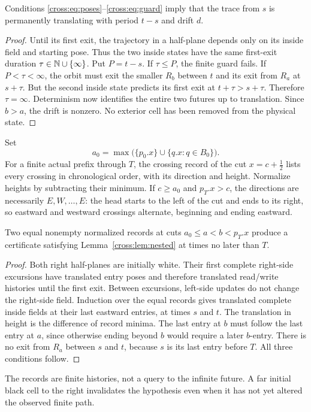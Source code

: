 \begin{lemma}\label{cross:lem:nested}
Conditions \eqref{cross:eq:poses}--\eqref{cross:eq:guard} imply that the trace from $s$ is
permanently translating with period $t-s$ and drift $d$.
\end{lemma}
\begin{proof}
Until its first exit, the trajectory in a half-plane depends only on its inside
field and starting pose. Thus the two inside states have the same first-exit
duration $\tau\in\mathbb N\cup\{\infty\}$. Put $P=t-s$. If $\tau\le P$, the finite
guard fails. If $P<\tau<\infty$, the orbit must exit the smaller $R_b$ between
$t$ and its exit from $R_a$ at $s+\tau$. But the second inside state predicts
its first exit at $t+\tau>s+\tau$. Therefore $\tau=\infty$. Determinism now
identifies the entire two futures up to translation. Since $b>a$, the drift
is nonzero. No exterior cell has been removed from the physical state.
\end{proof}

Set
\[
 a_0=\max\bigl(\{p_0.x\}\cup\{q.x:q\in B_0\}\bigr).
\]
For a finite actual prefix through $T$, the crossing record of the cut
$x=c+\tfrac12$ lists every crossing in chronological order, with its direction
and height. Normalize heights by subtracting their minimum. If $c\ge a_0$ and
$p_T.x>c$, the directions are necessarily $E,W,\ldots,E$: the head starts
to the left of the cut and ends to its right, so eastward and westward
crossings alternate, beginning and ending eastward.

\begin{lemma}\label{cross:lem:records}
Two equal nonempty normalized records at cuts $a_0\le a<b<p_T.x$ produce a
certificate satisfying Lemma~\ref{cross:lem:nested} at times no later than $T$.
\end{lemma}
\begin{proof}
Both right half-planes are initially white. Their first complete right-side
excursions have translated entry poses and therefore translated read/write
histories until the first exit. Between excursions, left-side updates do not
change the right-side field. Induction over the equal records gives translated
complete inside fields at their last eastward entries, at times $s$ and $t$.
The translation in height is the difference of record minima. The last entry
at $b$ must follow the last entry at $a$, since otherwise ending beyond $b$
would require a later $b$-entry. There is no exit from $R_a$ between $s$ and
$t$, because $s$ is its last entry before $T$. All three conditions follow.
\end{proof}
The records are finite histories, not a query to the infinite future. A far
initial black cell to the right invalidates the hypothesis even when it has
not yet altered the observed finite path.


